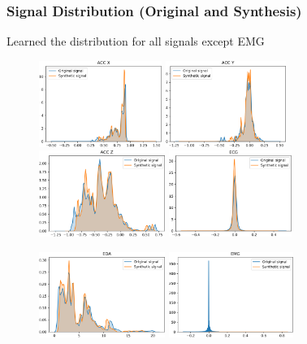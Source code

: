 \documentclass[unknownkeysallowed]{beamer}
\begin{document}
\begin{frame}
\frametitle{Signal Distribution (Original and Synthesis)}

Learned the distribution for all signals except EMG

\begin{figure}
  \centering
  \includegraphics[width=.24\textwidth, height=2.8cm]{figs/dist_stress_ACC_X_acii2019_pres.png}\hfill
  \includegraphics[width=.24\textwidth, height=2.8cm]{figs/dist_stress_ACC_Y_acii2019_pres.png}\hfill
  \includegraphics[width=.24\textwidth, height=2.8cm]{figs/dist_stress_ACC_Z_acii2019_pres.png}\hfill
  \includegraphics[width=.24\textwidth, height=2.8cm]{figs/dist_stress_ECG_acii2019_pres.png}\par
  \includegraphics[width=.24\textwidth, height=2.8cm]{figs/dist_stress_EDA_acii2019_pres.png}\hfill
  \includegraphics[width=.24\textwidth, height=2.8cm]{figs/dist_stress_EMG_acii2019_pres.png}\hfill

\end{figure}
\end{frame}
\end{document}
